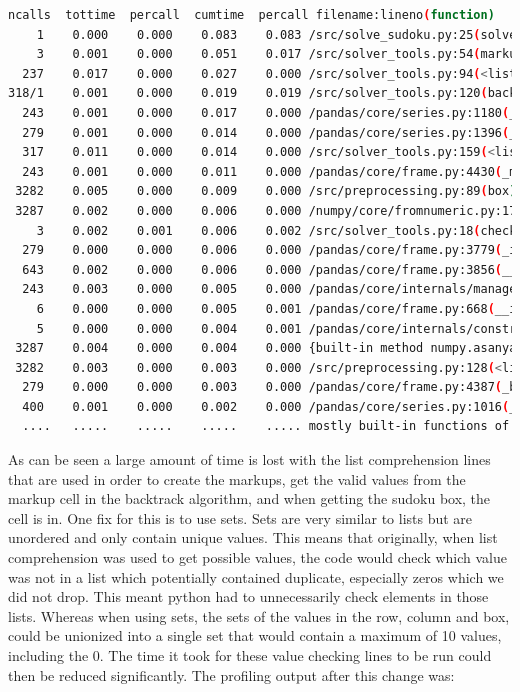 \documentclass[12pt]{report} %
\begin{document}
\begin{lstlisting}[language=Bash, basicstyle=\tiny]
ncalls  tottime  percall  cumtime  percall filename:lineno(function)
    1    0.000    0.000    0.083    0.083 /src/solve_sudoku.py:25(solve_sudoku 
    3    0.001    0.000    0.051    0.017 /src/solver_tools.py:54(markup)
  237    0.017    0.000    0.027    0.000 /src/solver_tools.py:94(<listcomp>)
318/1    0.001    0.000    0.019    0.019 /src/solver_tools.py:120(backtrack_alg)
  243    0.001    0.000    0.017    0.000 /pandas/core/series.py:1180(__setitem__) 
  279    0.001    0.000    0.014    0.000 /pandas/core/series.py:1396(_maybe_update_cacher)
  317    0.011    0.000    0.014    0.000 /src/solver_tools.py:159(<listcomp>)
  243    0.001    0.000    0.011    0.000 /pandas/core/frame.py:4430(_maybe_cache_changed)
 3282    0.005    0.000    0.009    0.000 /src/preprocessing.py:89(box) 
 3287    0.002    0.000    0.006    0.000 /numpy/core/fromnumeric.py:1768(ravel)
    3    0.002    0.001    0.006    0.002 /src/solver_tools.py:18(check_sudoku)
  279    0.000    0.000    0.006    0.000 /pandas/core/frame.py:3779(_ixs)
  643    0.002    0.000    0.006    0.000 /pandas/core/frame.py:3856(__getitem__)
  243    0.003    0.000    0.005    0.000 /pandas/core/internals/managers.py:1045(iset)
    6    0.000    0.000    0.005    0.001 /pandas/core/frame.py:668(__init__)
    5    0.000    0.000    0.004    0.001 /pandas/core/internals/construction.py:423(dict_to_mgr)
 3287    0.004    0.000    0.004    0.000 {built-in method numpy.asanyarray}
 3282    0.003    0.000    0.003    0.000 /src/preprocessing.py:128(<listcomp>)
  279    0.000    0.000    0.003    0.000 /pandas/core/frame.py:4387(_box_col_values)
  400    0.001    0.000    0.002    0.000 /pandas/core/series.py:1016(__getitem__)
  ....   .....    .....    .....    ..... mostly built-in functions of packages
\end{lstlisting}

As can be seen a large amount of time is lost with the list comprehension lines that are used in order to create the markups, get the valid values from the markup cell in the backtrack algorithm, and when getting the sudoku box, the cell is in. One fix for this is to use sets. Sets are very similar to lists but are unordered and only contain unique values\cite{freecodecamp_python_set_vs_list}. This means that originally, when list comprehension was used to get possible values, the code would check which value was not in a list which potentially contained duplicate, especially zeros which we did not drop. This meant python had to unnecessarily check elements in those lists. Whereas when using sets, the sets of the values in the row, column and box, could be unionized into a single set that would contain a maximum of 10 values, including the 0. The time it took for these value checking lines to be run could then be reduced significantly. The profiling output after this change was:
\end{document}
